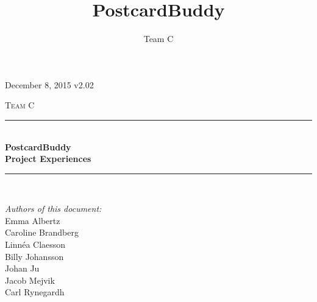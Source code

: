 \documentclass[10pt,a4paper]{article}
\title{PostcardBuddy}
\author{Team C}
\begin{document}
\begin{titlepage}
\newcommand{\HRule}{\rule{\linewidth}{0.5mm}}


\begin{flushright}
December 8, 2015 v2.02\\[3cm]
\end{flushright}


\centering
\textsc{\LARGE Team C}\\[0.5cm]

\HRule \\[0.4cm]
{ \huge \bfseries PostcardBuddy}\\[0.3cm]
{\Large \bfseries Project Experiences}\\[0.4cm] %
\HRule \\[1.5cm]

\vfill
\begin{flushleft}
\textit{Authors of this document:}\\
Emma Albertz\\
Caroline Brandberg\\
Linnéa Claesson\\
Billy Johansson\\
Johan Ju\\
Jacob Mejvik\\
Carl Rynegardh
\end{flushleft}

\end{titlepage}



%



\setcounter{tocdepth}{2}
\tableofcontents
\newpage
{}

\end{document}
